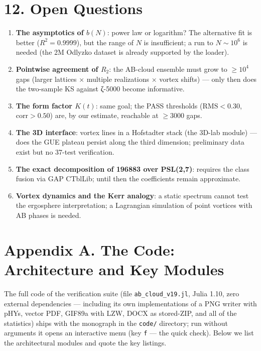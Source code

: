 \documentclass[
]{article}
\providecommand{\tightlist}{%
  \setlength{\itemsep}{0pt}\setlength{\parskip}{0pt}}
\begin{document}
\section{12. Open Questions}\label{open-questions}

\begin{enumerate}
\def\labelenumi{\arabic{enumi}.}
\tightlist
\item
  \textbf{The asymptotics of \(b(N)\)}: power law or logarithm? The
  alternative fit is better (\(R^2=0.9999\)), but the range of \(N\) is
  insufficient; a run to \(N\sim10^6\) is needed (the 2M Odlyzko dataset
  is already supported by the loader).
\item
  \textbf{Pointwise agreement of \(R_2\)}: the AB-cloud ensemble must
  grow to \(\ge10^4\) gaps (larger lattices × multiple realizations ×
  vortex shifts) --- only then does the two-sample KS against ζ-5000
  become informative.
\item
  \textbf{The form factor \(K(t)\)}: same goal; the PASS thresholds
  (\(\mathrm{RMS}<0.30\), \(\mathrm{corr}>0.50\)) are, by our estimate,
  reachable at \(\ge3000\) gaps.
\item
  \textbf{The 3D interface}: vortex lines in a Hofstadter stack (the
  3D-lab module) --- does the GUE plateau persist along the third
  dimension; preliminary data exist but no 37-test verification.
\item
  \textbf{The exact decomposition of 196883 over PSL(2,7)}: requires the
  class fusion via GAP CTblLib; until then the coefficients remain
  approximate.
\item
  \textbf{Vortex dynamics and the Kerr analogy}: a static spectrum
  cannot test the ergosphere interpretation; a Lagrangian simulation of
  point vortices with AB phases is needed.
\end{enumerate}

\section{Appendix A. The Code: Architecture and Key
Modules}\label{appendix-a.-the-code-architecture-and-key-modules}

The full code of the verification suite (file
\texttt{ab\_cloud\_v19.jl}, Julia 1.10, zero external dependencies ---
including its own implementations of a PNG writer with pHYs, vector PDF,
GIF89a with LZW, DOCX as stored-ZIP, and all of the statistics) ships
with the monograph in the \texttt{code/} directory; run without
arguments it opens an interactive menu (key \texttt{f} --- the quick
check). Below we list the architectural modules and quote the key
listings.
\end{document}
